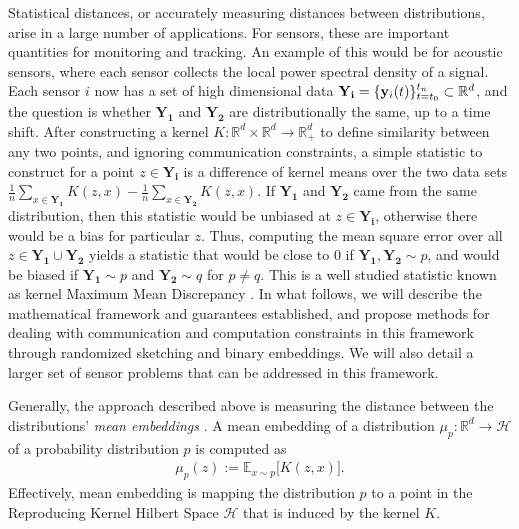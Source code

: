 Statistical distances, or accurately measuring distances between distributions, arise in a large number of applications.  For sensors, these are important quantities for monitoring and tracking.
An example of this would be for acoustic sensors, where each sensor collects the local power spectral density of a signal.  Each sensor $i$ now has a set of high dimensional data $\mathbf{Y_i}=\{\mathbf{y}_i(t)\}_{t=t_0}^{t_n}\subset \mathbb{R}^d$, and the question is whether $\mathbf{Y_1}$ and $\mathbf{Y_2}$ are distributionally the same, up to a time shift.  After constructing a kernel $K: \mathbb{R}^d\times \mathbb{R}^d \rightarrow \mathbb{R}^d_+$ to define similarity between any two points, and ignoring communication constraints, a simple statistic to construct for a point $z \in \mathbf{Y_i}$ is a difference of kernel means over the two data sets $\frac{1}{n}\sum_{x\in \mathbf{Y_1}} K(z,x) - \frac{1}{n}\sum_{x\in \mathbf{Y_2}} K(z,x)$.  If $\mathbf{Y_1}$ and $\mathbf{Y_2}$ came from the same distribution, then this statistic would be unbiased at $z\in \mathbf{Y_i}$, otherwise there would be a bias for particular $z$.  Thus, computing the mean square error over all $z\in \mathbf{Y_1}\cup \mathbf{Y_2}$ yields a statistic that would be close to 0 if $\mathbf{Y_1},\mathbf{Y_2}\sim p$, and would be biased if $\mathbf{Y_1}\sim p$ and $\mathbf{Y_2}\sim q$ for $p\neq q$.  This is a well studied statistic known as kernel Maximum Mean Discrepancy \cite{}.  In what follows, we will describe the mathematical framework and guarantees established, and propose methods for dealing with communication and computation constraints in this framework through randomized sketching and binary embeddings.  We will also detail a larger set of sensor problems that can be addressed in this framework.


Generally, the approach described above is measuring the distance between the distributions' \emph{mean embeddings} \cite{muandet2017kernel}.  A mean embedding of a distribution $\mu_p:\mathbb{R}^d\rightarrow \mathcal{H}$ of a probability distribution $p$ is computed as
\begin{align*}
    \mu_p(z) := \mathbb{E}_{x\sim p} \big[K(z,x)\big].
\end{align*}
Effectively, mean embedding is mapping the distribution $p$ to a point in the Reproducing Kernel Hilbert Space $\mathcal{H}$ that is induced by the kernel $K$.

